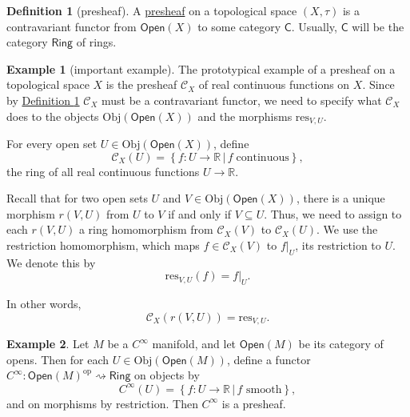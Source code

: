 \documentclass[a4paper,10pt]{scrreprt}
\newcommand{\R}{\mathbb{R}}
\newcommand{\defn}[1]{\ul{#1}}
\newcommand{\Obj}{\mathrm{Obj}}
\theoremstyle{definition}
\newtheorem{definition}{Definition}[section]
\newtheorem{example}{Example}[section]
\theoremstyle{plain}
\theoremstyle{remark}
\begin{document}
\begin{definition}[presheaf] 
  \label{def:presheaf}
  A \defn{presheaf} on a topological space $(X,\tau)$ is a contravariant functor from $\mathsf{Open}(X)$ to some category $\mathsf{C}$. Usually, $\mathsf{C}$ will be the category $\mathsf{Ring}$ of rings.  
\end{definition}

\begin{example}[important example] 
  \label{eg:functionpresheaf} 
  The prototypical example of a presheaf on a topological space $X$ is the presheaf $\mathcal{C}_{X}$ of real continuous functions on $X$. Since by \hyperref[def:presheaf]{Definition \ref*{def:presheaf}} $\mathcal{C}_X$ must be a contravariant functor, we need to specify what $\mathcal{C}_{X}$ does to the objects $\Obj(\mathsf{Open}(X))$ and the morphisms $\mathrm{res}_{V,U}$.

  For every open set $U \in \Obj(\mathsf{Open}(X))$, define
  \begin{equation*} 
    \mathcal{C}_{X}(U) = \left\{ f\colon U \to \R\,\big| \, f\; \mathrm{ continuous} \right\}, 
  \end{equation*} 
  the ring of all real continuous functions $U \to \R$.

  Recall that for two open sets $U$ and $V \in \Obj(\mathsf{Open}(X))$, there is a unique morphism $r(V,U)$ from $U$ to $V$ if and only if $V \subseteq U$. Thus, we need to assign to each $r(V,U)$ a ring homomorphism from $\mathcal{C}_{X}(V)$ to $\mathcal{C}_{X}(U)$. We use the restriction homomorphism, which maps $f \in \mathcal{C}_{X}(V)$ to $f|_{U}$, its restriction to $U$. We denote this by
  \begin{equation*}
    \mathrm{res}_{V,U}(f) = f|_{U}.
  \end{equation*}

  In other words,
  \begin{equation*}
    \mathcal{C}_{X}(r(V,U)) = \mathrm{res}_{V,U}.
  \end{equation*}
\end{example}

\begin{example}
  \label{eg:smoothpresheaf}
  Let $M$ be a $C^{\infty}$ manifold, and let $\mathsf{Open}(M)$ be its category of opens. Then for each $U \in \Obj(\mathsf{Open}(M))$, define a functor $C^{\infty}\colon \mathsf{Open}(M)^{\text{op}} \rightsquigarrow \mathsf{Ring}$ on objects by
  \begin{equation*}
    C^{\infty}(U) = \left\{ f\colon U \to \R\,\big|\, f\text{ smooth} \right\},
  \end{equation*}
  and on morphisms by restriction. Then $C^{\infty}$ is a presheaf.
\end{example}
\end{document}
